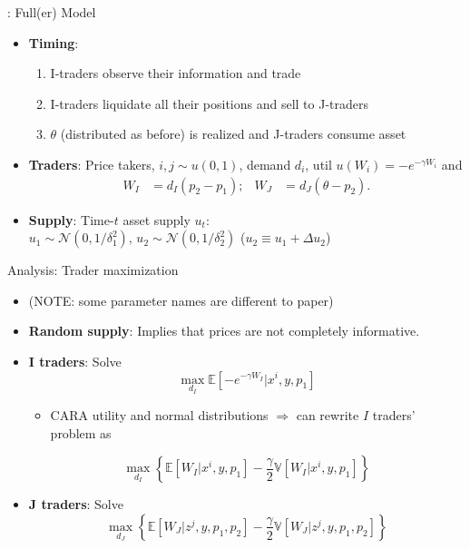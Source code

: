 \documentclass[english,10pt
,aspectratio=169
]{beamer}
\begin{document}
\begin{frame}{\cite{kondor_more_2012}: Full(er) Model}
	\begin{itemize}
		\item \textbf{Timing}: 
		\begin{enumerate}
			\item I-traders observe their information and trade
			\item I-traders liquidate all their positions and sell to J-traders
			\item $\theta$ (distributed as before) is realized and J-traders consume asset
		\end{enumerate}
		\item \textbf{Traders}: Price takers, $i, j\sim u(0,1)$, demand $d_i$, util $u(W_i)=-e^{-\gamma W_i}$ and   
		\begin{align*}
			W_I & = {d_I}(p_2-p_1); &
			W_J & = {d_J}(\theta-p_2).
		\end{align*}
		\item \textbf{Supply}: Time-$t$ asset supply  $u_t$: \\$u_1 \sim \mathcal{N}(0,1/\delta^2_1)$, $u_2\sim \mathcal{N}(0,1/\delta^2_2)$ ($u_2 \equiv u_1 + \varDelta u_2$)
	\end{itemize}
\end{frame}


\begin{frame}{Analysis: Trader maximization}
	\begin{itemize}
		\item (NOTE: some parameter names are different to paper)
		\item \textbf{Random supply}: Implies that prices are not completely informative.
		\item \textbf{I traders}: Solve
		\[
			\max_{d_I} \mathbb{E}\left[ -e^{-\gamma W_I}| x^i, y, p_1 \right]
		\]
		\begin{itemize}
			\item CARA utility and normal distributions $\Rightarrow$ can rewrite $I$ traders' problem as
		\end{itemize}
		\[
			\max_{d_I} \left\{\mathbb{E}\left[W_I| x^i, y, p_1\right]-\frac{\gamma}{2} \mathbb{V}\left[W_I| x^i, y, p_1\right]\right\}
		\]
		\item \textbf{J traders}: Solve
		\[
			\max_{d_J} \left\{\mathbb{E}\left[W_J| z^j, y, p_1, p_2\right]-\frac{\gamma}{2} \mathbb{V}\left[W_J| z^j, y, p_1, p_2\right] \right\}
		\]
	\end{itemize}
\end{frame}
\end{document}
